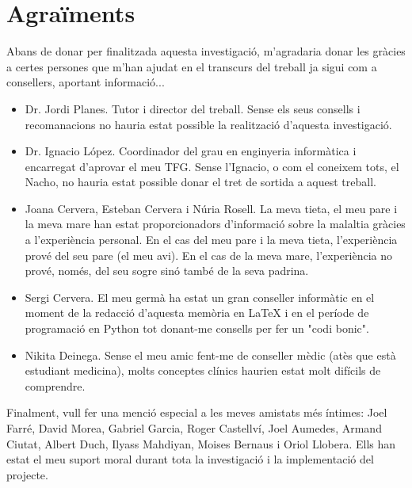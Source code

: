 \documentclass[a4paper,12pt]{article}
\begin{document}
\section*{Agraïments}
Abans de donar per finalitzada aquesta investigació, m'agradaria donar les gràcies a certes persones que m'han ajudat en el transcurs del treball ja sigui com a consellers, aportant informació...
\begin{itemize}
    \item Dr. Jordi Planes. Tutor i director del treball. Sense els seus consells i recomanacions no hauria estat possible la realització d'aquesta investigació.
    \item  Dr. Ignacio López. Coordinador del grau en enginyeria informàtica i encarregat d'aprovar el meu TFG. Sense l'Ignacio, o com el coneixem tots, el Nacho, no hauria estat possible donar el tret de sortida a aquest treball.
    \item Joana Cervera, Esteban Cervera i Núria Rosell. La meva tieta, el meu pare i la meva mare han estat proporcionadors d'informació sobre la malaltia gràcies a l'experiència personal. En el cas del meu pare i la meva tieta, l'experiència prové del seu pare (el meu avi). En el cas de la meva mare, l'experiència no prové, només, del seu sogre sinó també de la seva padrina.
    \item Sergi Cervera. El meu germà ha estat un gran conseller informàtic en el moment de la redacció d'aquesta memòria en LaTeX i en el període de programació en Python tot donant-me consells per fer un "codi bonic".
    \item Nikita Deinega. Sense el meu amic fent-me de conseller mèdic (atès que està estudiant medicina), molts conceptes clínics haurien estat molt difícils de comprendre.
\end{itemize}
Finalment, vull fer una menció especial a les meves amistats més íntimes: Joel Farré, David Morea, Gabriel Garcia, Roger Castellví, Joel Aumedes, Armand Ciutat, Albert Duch, Ilyass Mahdiyan, Moises Bernaus i Oriol Llobera. Ells han estat el meu suport moral durant tota la investigació i la implementació del projecte.
\end{document}
